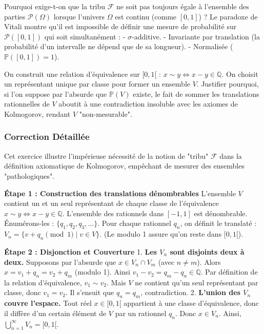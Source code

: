 \documentclass[11pt,a4paper]{article}
\begin{document}
Pourquoi exige-t-on que la tribu $\mathcal{F}$ ne soit pas toujours égale à l'ensemble des parties $\mathcal{P}(\Omega)$ lorsque l'univers $\Omega$ est continu (comme $[0, 1]$) ?
Le paradoxe de Vitali montre qu'il est impossible de définir une mesure de probabilité sur $\mathcal{P}([0, 1])$ qui soit simultanément :
- $\sigma$-additive.
- Invariante par translation (la probabilité d'un intervalle ne dépend que de sa longueur).
- Normalisée ($\mathbb{P}([0, 1]) = 1$).

On construit une relation d'équivalence sur $[0, 1[$ : $x \sim y \iff x - y \in \mathbb{Q}$. On choisit un représentant unique par classe pour former un ensemble $V$.
Justifier pourquoi, si l'on suppose par l'absurde que $\mathbb{P}(V)$ existe, le fait de sommer les translations rationnelles de $V$ aboutit à une contradiction insoluble avec les axiomes de Kolmogorov, rendant $V$ "non-mesurable".


\subsubsection*{Correction Détaillée}

Cet exercice illustre l'impérieuse nécessité de la notion de "tribu" $\mathcal{F}$ dans la définition axiomatique de Kolmogorov, empêchant de mesurer des ensembles "pathologiques".

\textbf{Étape 1 : Construction des translations dénombrables}
L'ensemble $V$ contient un et un seul représentant de chaque classe de l'équivalence $x \sim y \iff x-y \in \mathbb{Q}$.
L'ensemble des rationnels dans $[-1, 1]$ est dénombrable. Énumérons-les : $\{q_1, q_2, q_3, \dots\}$.
Pour chaque rationnel $q_n$, on définit le translaté : $V_n = \{v + q_n \pmod 1 \mid v \in V\}$. (Le modulo 1 assure qu'on reste dans $[0, 1[$).

\textbf{Étape 2 : Disjonction et Couverture}
1. \textbf{Les $V_n$ sont disjoints deux à deux.} Supposons par l'absurde que $x \in V_n \cap V_m$ (avec $n \neq m$). Alors $x = v_1 + q_n = v_2 + q_m$ (modulo 1). Ainsi $v_1 - v_2 = q_m - q_n \in \mathbb{Q}$. Par définition de la relation d'équivalence, $v_1 \sim v_2$. Mais $V$ ne contient qu'un seul représentant par classe, donc $v_1 = v_2$. Il s'ensuit que $q_n = q_m$, contradiction.
2. \textbf{L'union des $V_n$ couvre l'espace.} Tout réel $x \in [0, 1[$ appartient à une classe d'équivalence, donc il diffère d'un certain élément de $V$ par un rationnel $q_n$. Donc $x \in V_n$.
Ainsi, $\bigcup_{n=1}^\infty V_n = [0, 1[$.
\end{document}
